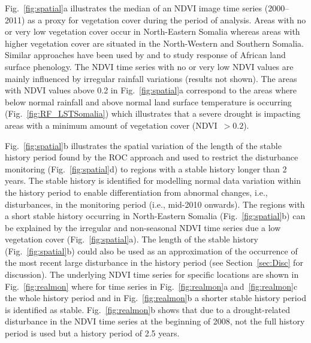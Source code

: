 \documentclass[authoryear,preprint,review,10pt]{elsarticle}
\begin{document}
Fig.~\ref{fig:spatial}a illustrates the median of an NDVI image time series (2000--2011) as a proxy for vegetation cover during the period of analysis. Areas
with no or very low vegetation cover occur in North-Eastern Somalia whereas areas with higher vegetation cover are situated in the North-Western and Southern Somalia. Similar approaches have been used by \citet{Brown:2010fq} and \citet{Vrieling:2011da} to study response of African land surface phenology. The NDVI time series with no or very low NDVI values are mainly influenced by irregular rainfall variations (results not shown). The areas with NDVI values above 0.2 in Fig.~\ref{fig:spatial}a correspond to the areas where below normal rainfall and above normal land surface temperature is occurring (Fig.~\ref{fig:RF_LSTSomalia}) which illustrates that a severe drought is impacting areas with a minimum amount of vegetation cover (NDVI~$> 0.2$). 

Fig.~\ref{fig:spatial}b illustrates the spatial variation of the length of the stable history period found by the ROC approach and used to restrict the
disturbance monitoring (Fig.~\ref{fig:spatial}d) to regions with a stable history longer than 2 years. The stable history is identified for modelling normal
data variation within the history period to enable differentiation from abnormal changes, i.e., disturbances, in the monitoring period (i.e., mid-2010
onwards). The regions with a short stable history occurring in North-Eastern Somalia (Fig.~\ref{fig:spatial}b) can be explained by the irregular and
non-seasonal NDVI time series due a low vegetation cover (Fig.~\ref{fig:spatial}a). The length of the stable history (Fig.~\ref{fig:spatial}b) could also be
used as an approximation of the occurrence of the most recent large disturbance in the history period (see Section~\ref{sec:Disc} for discussion).
The underlying
NDVI time series for specific locations are shown in Fig.~\ref{fig:realmon} where for time series in Fig.~\ref{fig:realmon}a and~\ref{fig:realmon}c the whole
history period and in Fig.~\ref{fig:realmon}b a shorter stable history period is identified as stable. Fig.~\ref{fig:realmon}b shows that due to a
drought-related disturbance in the NDVI time series at the beginning of 2008, not the full history period is used but a history period of 2.5 years. 

\end{document}
